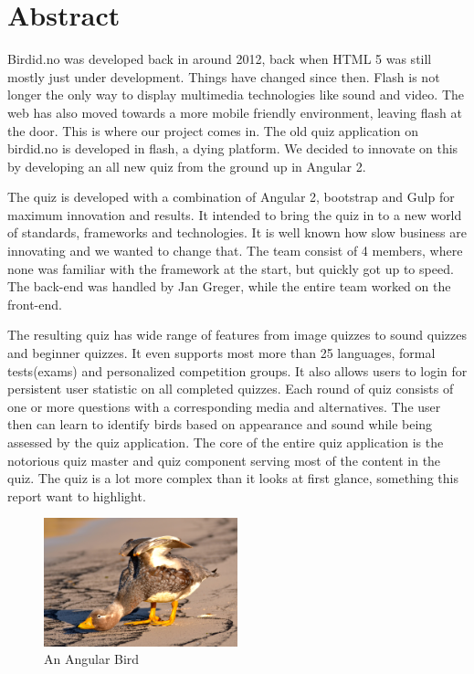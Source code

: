 \chapter{Abstract}
\label{chap:abstract}


Birdid.no was developed back in around 2012, back when HTML 5 was still mostly just under development. Things have changed since then. Flash is not longer the only way to display multimedia technologies like sound and video. The web has also moved towards a more mobile friendly environment, leaving flash at the door. This is where our project comes in. The old quiz application on birdid.no is developed in flash, a dying platform. We decided to innovate on this by developing an all new quiz from the ground up in Angular 2. 

The quiz is developed with a combination of Angular 2, bootstrap and Gulp for maximum innovation and results. It intended to bring the quiz in to a new world of standards, frameworks and technologies. It is well known how slow business are innovating and we wanted to change that. The team consist of 4 members, where none was familiar with the framework at the start, but quickly got up to speed. The back-end was handled by Jan Greger, while the entire team worked on the front-end.

The resulting quiz has wide range of features from image quizzes to sound quizzes and beginner quizzes. It even supports most more than 25  languages, formal tests(exams) and personalized competition groups. It also allows users to login for persistent user statistic on all completed quizzes. Each round of quiz consists of one or more questions with a corresponding media and alternatives. The user then can learn to identify birds based on appearance and sound while being assessed by the quiz application. The core of the entire quiz application is the notorious quiz master and quiz component serving most of the content in the quiz. The quiz is a lot more complex than it looks at first glance, something this report want to highlight.




\begin{figure}[h]
  \centering
  \includegraphics[width=0.5\textwidth]{figures/angbirds.jpg}
  \caption[AngularBird]{An Angular Bird}
  \label{fig:AngularBird}
\end{figure}

